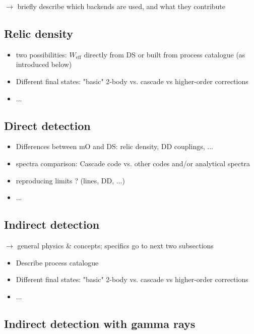 $\to$ briefly describe which backends are used, and what they contribute 


\subsection{Relic density}
\label{code_rd}
\begin{itemize}
\item two possibilities: $W_\mathrm{eff}$ directly from DS or built from process catalogue (as introduced below)
\item Different final states: "basic" 2-body vs. cascade vs higher-order corrections
\item...
\end{itemize}

\subsection{Direct detection}
\label{code_dd}
\begin{itemize}
\item Differences between mO and DS: relic density, DD couplings, ...
\item spectra comparison: Cascade code vs. other codes and/or analytical spectra
\item reproducing limits ? (lines, DD, ...)
\item...
\end{itemize}



\subsection{Indirect detection}
\label{code_id}

$\to$ general physics \& concepts; specifics go to next two subsections
\begin{itemize}
\item Describe process catalogue 
\item Different final states: "basic" 2-body vs. cascade vs higher-order corrections
\item...
\end{itemize}

\subsection{Indirect detection with gamma rays}
\label{code_ga}

